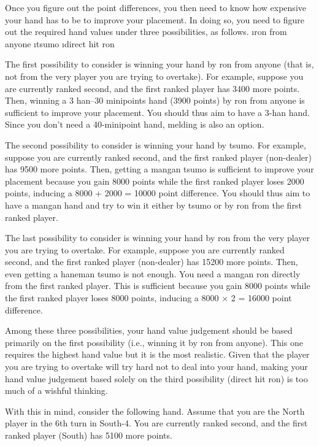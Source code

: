\bigskip
Once you figure out the point differences, you then need to know how expensive your hand has to be to improve your placement. In doing so, you need to figure out the required hand values under three possibilities, as follows.
\be
\i {\jap ron} from anyone
\i {\jap tsumo}
\i direct hit {\jap ron}
\ee

The first possibility to consider is winning your hand by {\jap ron} from anyone (that is, not from the very player you are trying to overtake). For example, suppose you are currently ranked second, and the first ranked player has 3400 more points. Then, winning a 3 {\jap han}--30 minipoints hand (3900 points) by {\jap ron} from anyone is sufficient to improve your placement. You should thus aim to have a 3-{\jap han} hand. Since you don't need a 40-minipoint hand, melding is also an option. 

\bigskip
The second possibility to consider is winning your hand by {\jap tsumo}. For example, suppose you are currently ranked second, and the first ranked player (non-dealer) has 9500 more points. Then, getting a {\jap mangan tsumo} is sufficient to improve your placement because you gain 8000 points while the first ranked player loses 2000 points, inducing a 8000 + 2000 = 10000 point difference. You should thus aim to have a {\jap mangan} hand and try to win it either by {\jap tsumo} or by {\jap ron} from the first ranked player. 

\bigskip
The last possibility to consider is winning your hand by {\jap ron} from the very player you are trying to overtake. For example, suppose you are currently ranked second, and the first ranked player (non-dealer) has 15200 more points. Then, even getting a {\jap haneman tsumo} is not enough. You need a {\jap mangan ron} directly from the first ranked player. This is sufficient because you gain 8000 points while the first ranked player loses 8000 points, inducing a 8000 $\times$ 2 = 16000 point difference. 

\bigskip
Among these three possibilities, your hand value judgement should be based primarily on the first possibility (i.e., winning it by {\jap ron} from anyone). This one requires the highest hand value but it is the most realistic. Given that the player you are trying to overtake will try hard not to deal into your hand, making your hand value judgement based solely on the third possibility (direct hit {\jap ron}) is too much of a wishful thinking. 

\bigskip
With this in mind, consider the following hand. Assume that you are the North player in the 6th turn in South-4. You are currently ranked second, and the first ranked player (South) has 5100 more points. 

